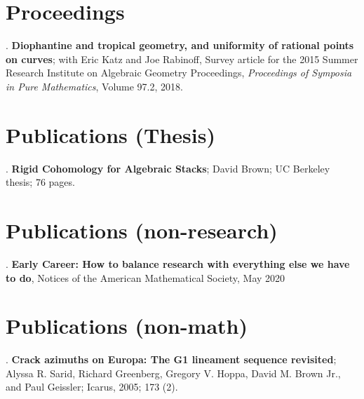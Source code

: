 \documentclass[margin,line]{res}
\newcounter{pubs}
\begin{document}
\begin{resume}
\section{\sc Proceedings }
 . \textbf{Diophantine and tropical geometry, and uniformity of   rational points on curves}; with Eric Katz and Joe Rabinoff, Survey article for the 2015 Summer Research Institute on Algebraic Geometry Proceedings, \emph{Proceedings of Symposia in Pure Mathematics}, Volume 97.2, 2018. \vspace{.08cm}\\



\section{\sc Publications {(Thesis)}}
 . \textbf{Rigid Cohomology for Algebraic Stacks}; David Brown; UC Berkeley thesis; 76 pages. \vspace{.08cm}\\




\section{\sc Publications (non-research)}
 . \textbf{Early Career: How to balance research with everything else we have to do}, Notices of the American Mathematical Society, May 2020



\section{\sc Publications (non-math)}

 .  \textbf{Crack azimuths on Europa: The G1 lineament sequence revisited}; Alyssa R. Sarid, Richard Greenberg, Gregory V. Hoppa, David M. Brown Jr., and Paul Geissler; Icarus, 2005; 173 (2). \vspace{.08cm}\\ 



\end{resume}
\end{document}
